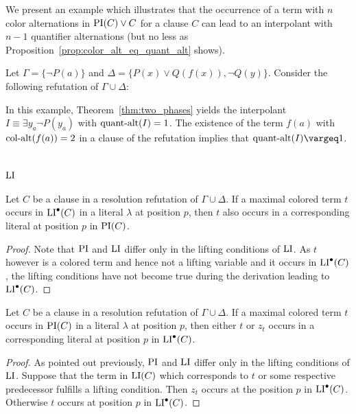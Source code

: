 \documentclass[,%
	draft=false,%
	numbers=noendperiod
	12pt,
	a4paper,
	oneside,%
	openany,
]{memoir}
\begin{document}
We present an example which illustrates that the occurrence of a term with $n$ color alternations in $\PI(C) \lor C$ for a clause $C$ can lead to an interpolant with $n-1$ quantifier alternations (but no less as Proposition~\ref{prop:color_alt_eq_quant_alt} shows).
\begin{exa}
	Let $\Gamma = \{ \lnot P(a) \}$ and $\Delta = \{ P(x) \lor Q(f(x)), \lnot Q(y) \}$.
	Consider the following refutation of $\Gamma \cup \Delta$:
	\begin{prooftree}


	\end{prooftree}

	In this example, Theorem~\ref{thm:two_phases} yields the interpolant $I \equiv \exists y_a \lnot P(y_a)$ with $\qa(I) =\nolinebreak 1$.
	The existence of the term $f(a)$ with $\ca(f(a)) = 2$ in a clause of the refutation implies that $\qa(I) \vargeq 1$.
\end{exa}



\section{$\LI$}


\begin{clemma}
	\label{lemma:pi_li_1}
	Let $C$ be a clause in a resolution refutation of $\Gamma \cup \Delta$.
	If a maximal colored term $t$ occurs in $\LIpre(C)$ in a literal $\lambda$ at position $p$, 
	then $t$ also occurs in a corresponding literal at position $p$ in $\PI(C)$.
\end{clemma}
\begin{proof}
	Note that $\PI$ and $\LI$ differ only in the lifting conditions of $\LI$.
	As $t$ however is a colored term and hence not a lifting variable and it occurs in $\LIpre(C)$, the lifting conditions have not become true during the derivation leading to $\LIpre(C)$.
\end{proof}

\begin{clemma}
	\label{lemma:pi_li_2}
	Let $C$ be a clause in a resolution refutation of $\Gamma \cup \Delta$.
	If a maximal colored term $t$ occurs in $\PI(C)$ in a literal $\lambda$ at position $p$, 
	then either $t$ or $z_t$ occurs in a corresponding literal at position $p$ in $\LIpre(C)$.
\end{clemma}
\begin{proof}
	As pointed out previously, $\PI$ and $\LI$ differ only in the lifting conditions of $\LI$.
	Suppose that the term in $\LI(C)$ which corresponds to $t$ or some respective predecessor fulfills a lifting condition.
	Then $z_t$ occurs at the position $p$ in $\LIpre(C)$.
	Otherwise $t$ occurs at position $p$ in $\LIpre(C)$.
\end{proof}
\end{document}
